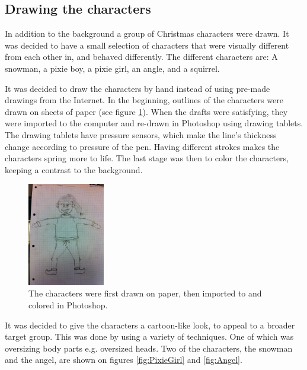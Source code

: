 \subsection{Drawing the characters}
In addition to the background a group of Christmas characters were drawn. It was decided to have a small selection of characters that were visually different from each other in, and behaved differently.
The different characters are: A snowman, a pixie boy, a pixie girl, an angle, and a squirrel.

It was decided to draw the characters by hand instead of using pre-made drawings from the Internet. In the beginning, outlines of the characters were drawn on sheets of paper (see figure \ref{fig:boy_sketch}). When the drafts were satisfying, they were imported to the computer and re-drawn in Photoshop using drawing tablets. The drawing tablets have pressure sensors, which make the line's thickness change according to pressure of the pen. Having different strokes makes the characters spring more to life. The last stage was then to color the characters, keeping a contrast to the background.

\begin{figure}[htbp]
\centering
\includegraphics[width=0.30\textwidth]{Pictures/Design/boy_sketch}
\caption{The characters were first drawn on paper, then imported to and colored in Photoshop.}
\label{fig:boy_sketch}
\end{figure}

It was decided to give the characters a cartoon-like look, to appeal to a broader target group. This was done by using a variety of techniques. One of which was oversizing body parts e.g. oversized heads. Two of the characters, the snowman and the angel, are shown on figures \ref{fig:PixieGirl} and \ref{fig:Angel}.

